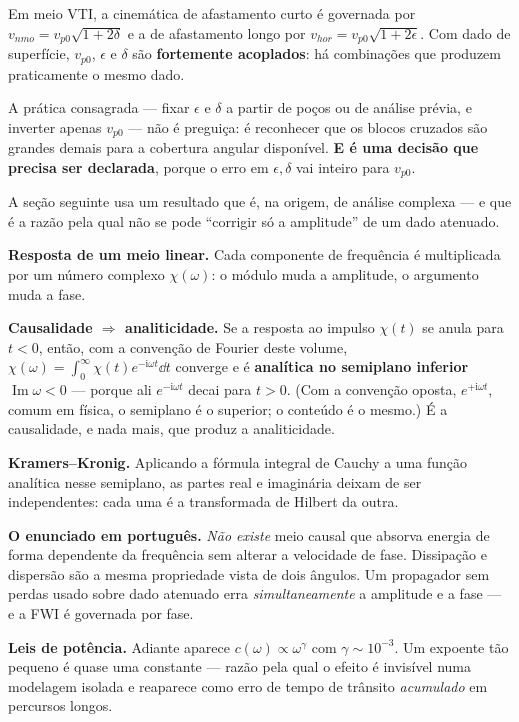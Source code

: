 \documentclass[11pt,a4paper,oneside]{report}
\begin{document}
\begin{armadilha}
Em meio VTI, a cinem\'atica de afastamento curto \'e governada por $v_{nmo} =
v_{p0}\sqrt{1+2\delta}$ e a de afastamento longo por
$v_{hor} = v_{p0}\sqrt{1+2\epsilon}$. Com dado de superf\'icie, $v_{p0}$,
$\epsilon$ e $\delta$ s\~ao \textbf{fortemente acoplados}: h\'a
combina\c{c}\~oes que produzem praticamente o mesmo dado.

A pr\'atica consagrada --- fixar $\epsilon$ e $\delta$ a partir de po\c{c}os
ou de an\'alise pr\'evia, e inverter apenas $v_{p0}$ --- n\~ao \'e
pregui\c{c}a: \'e reconhecer que os blocos cruzados s\~ao grandes demais para
a cobertura angular dispon\'ivel. \textbf{E \'e uma decis\~ao que precisa ser
declarada}, porque o erro em $\epsilon,\delta$ vai inteiro para $v_{p0}$.
\end{armadilha}

\begin{matematica}
A se\c{c}\~ao seguinte usa um resultado que \'e, na origem, de an\'alise
complexa --- e que \'e a raz\~ao pela qual n\~ao se pode ``corrigir s\'o a
amplitude'' de um dado atenuado.

\textbf{Resposta de um meio linear.} Cada componente de frequ\^encia \'e
multiplicada por um n\'umero complexo $\chi(\omega)$: o m\'odulo muda a
amplitude, o argumento muda a fase.

\textbf{Causalidade $\Rightarrow$ analiticidade.} Se a resposta ao impulso
$\chi(t)$ se anula para $t<0$, ent\~ao, com a conven\c{c}\~ao de Fourier deste
volume, $\chi(\omega) = \int_0^{\infty}\chi(t)e^{-\mathrm{i}\omega t}\dd t$
converge e \'e \textbf{anal\'itica no semiplano inferior}
$\operatorname{Im}\omega < 0$ --- porque ali $e^{-\mathrm{i}\omega t}$ decai para
$t>0$. (Com a conven\c{c}\~ao oposta, $e^{+\mathrm{i}\omega t}$, comum em
f\'isica, o semiplano \'e o superior; o conte\'udo \'e o mesmo.) \'E a
causalidade, e nada mais, que produz a analiticidade.

\textbf{Kramers--Kronig.} Aplicando a f\'ormula integral de Cauchy a uma
fun\c{c}\~ao anal\'itica nesse semiplano, as partes real e imagin\'aria
deixam de ser independentes: cada uma \'e a transformada de Hilbert da outra.

\textbf{O enunciado em portugu\^es.} \emph{N\~ao existe} meio causal que
absorva energia de forma dependente da frequ\^encia sem alterar a velocidade
de fase. Dissipa\c{c}\~ao e dispers\~ao s\~ao a mesma propriedade vista de dois
\^angulos. Um propagador sem perdas usado sobre dado atenuado erra
\emph{simultaneamente} a amplitude e a fase --- e a FWI \'e governada por fase.

\textbf{Leis de pot\^encia.} Adiante aparece $c(\omega)\propto\omega^{\gamma}$
com $\gamma\sim10^{-3}$. Um expoente t\~ao pequeno \'e quase uma constante ---
raz\~ao pela qual o efeito \'e invis\'ivel numa modelagem isolada e
reaparece como erro de tempo de tr\^ansito \emph{acumulado} em percursos
longos.
\end{matematica}
\end{document}
